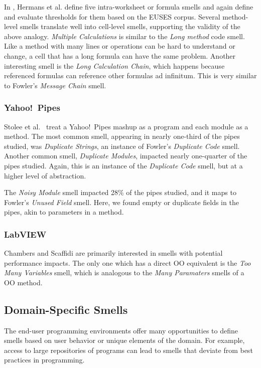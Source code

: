 \documentclass[10pt,conference,compsocconf]{IEEEtran}
\begin{document}
In \cite{Hermans2012intra}, Hermans et al. define five intra-worksheet or formula smells and again define and evaluate thresholds for them based on the EUSES corpus.
Several method-level smells translate well into cell-level smells, supporting the validity of the above analogy.
\textit{Multiple Calculations} is similar to the \textit{Long method} code smell.
Like a method with many lines or operations can be hard to understand or change, a cell that has a long formula can have the same problem.
Another interesting smell is the \textit{Long Calculation Chain}, which happens because referenced formulas can reference other formulas ad infinitum.
This is very similar to Fowler's \textit{Message Chain} smell.


\subsubsection{Yahoo!\ Pipes}
Stolee et al.~\cite{Stolee2011, StoleeTSE2013} treat a Yahoo!\ Pipes mashup as a program and each module as a method.  The most common smell, appearing in nearly one-third of the pipes studied, was \emph{Duplicate Strings}, an instance of Fowler's \emph{Duplicate Code} smell. 
Another common smell, \emph{Duplicate Modules}, impacted nearly one-quarter of the pipes studied. Again, this is an instance of the \emph{Duplicate Code} smell, but at a higher level of abstraction. 

The \emph{Noisy Module} smell impacted 28\% of the pipes studied, and it maps to Fowler's \emph{Unused Field} smell. Here, we found empty or duplicate fields in the pipes, akin to parameters in a method. 

\subsubsection{LabVIEW}

Chambers and Scaffidi \cite{chambers2013smell} are primarily interested in smells with potential performance impacts. The only one which has a direct OO equivalent is the \emph{Too Many Variables} smell, which is analogous to the \emph{Many Paramaters} smells of a OO method.

\subsection{Domain-Specific Smells}
The end-user programming environments offer many opportunities to define smells based on user behavior or unique elements of the domain. For example, access to large repositories of programs can lead to smells that deviate from best practices in programming.
\end{document}
